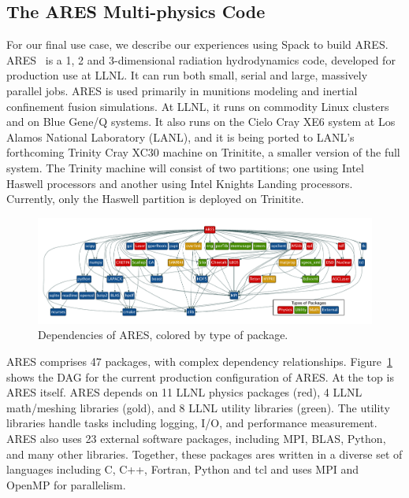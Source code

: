 
\subsection{The ARES Multi-physics Code}
\label{sec:ares}

For our final use case, we describe our experiences using Spack to build ARES.
ARES~\cite{ares1,ares2} is a 1, 2 and 3-dimensional radiation hydrodynamics code,
developed for production use at LLNL.  It can run both small, serial
and large, massively parallel jobs. ARES is used primarily in munitions modeling
and inertial confinement fusion simulations.
%
At LLNL, it runs on commodity Linux clusters and on Blue Gene/Q systems.
It also runs on the Cielo Cray XE6 system at Los Alamos National Laboratory (LANL), and
it is being ported to LANL's forthcoming Trinity Cray XC30 machine on Trinitite,
a smaller version of the full system.  The Trinity machine will consist of two partitions;
one using Intel Haswell processors and another using Intel Knights Landing processors.
Currently, only the Haswell partition is deployed on Trinitite.

\begin{figure}[t]
	\includegraphics[width=\textwidth]{figs/ares-dot/ares-fig.pdf}
	\caption{
		Dependencies of ARES, colored by type of package.
		\label{fig:ares}
	}
\end{figure}

ARES comprises 47 packages, with complex dependency relationships. 
Figure~\ref{fig:ares} shows the DAG for the current production configuration 
of ARES. At the top is ARES itself.  ARES depends on 11 LLNL physics packages 
(red), 4 LLNL math/meshing libraries (gold), and 8 LLNL utility libraries 
(green). The utility libraries handle tasks including logging, I/O, and 
performance measurement. ARES also uses 23 external software packages, 
including MPI, BLAS, Python, and many other libraries.  Together, these 
packages ares written in a diverse set of languages including C, C++, 
Fortran, Python and tcl and uses MPI and OpenMP for parallelism.

